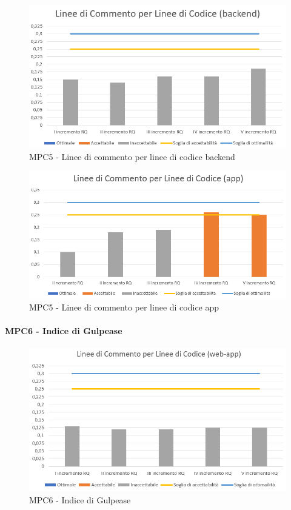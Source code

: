   \begin{figure}[h!]
    \centering
      \includegraphics[scale=1]{Immagini/lineeCommLineeCod BE.PNG}
    \caption{MPC5 - Linee di commento per linee di codice backend}
  \end{figure}

  \begin{figure}[h!]
    \centering
      \includegraphics[scale=1]{Immagini/lineeCommLineeCod APP.PNG}
    \caption{MPC5 - Linee di commento per linee di codice app}
  \end{figure}



  \newpage
  \paragraph{MPC6 - Indice di Gulpease}
  \begin{figure}[h!]
    \centering
      \includegraphics[scale=1]{Immagini/lineeCommLineeCod WA.PNG}
    \caption{MPC6 - Indice di Gulpease}
  \end{figure}



